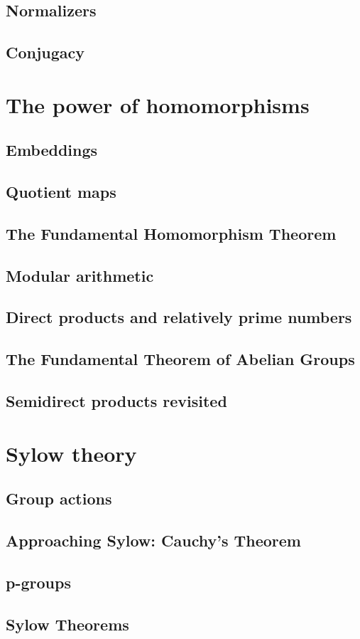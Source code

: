 \subsection{Normalizers}
\subsection{Conjugacy}

\section{The power of homomorphisms}
\subsection{Embeddings}
\subsection{Quotient maps}
\subsection{The Fundamental Homomorphism Theorem}
\subsection{Modular arithmetic}
\subsection{Direct products and relatively prime numbers}
\subsection{The Fundamental Theorem of Abelian Groups}
\subsection{Semidirect products revisited}

\pagebreak

\section{Sylow theory}
\subsection{Group actions}
\subsection{Approaching Sylow: Cauchy's Theorem}
\subsection{p-groups}
\subsection{Sylow Theorems}


